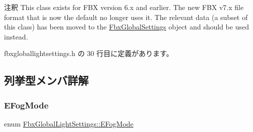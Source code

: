 \begin{DoxyRemark}{注釈}
This class exists for F\+BX version 6.\+x and earlier. The new F\+BX v7.\+x file format that is now the default no longer uses it. The relevant data (a subset of this class) has been moved to the \hyperlink{class_fbx_global_settings}{Fbx\+Global\+Settings} object and should be used instead. 
\end{DoxyRemark}


 fbxgloballightsettings.\+h の 30 行目に定義があります。



\subsection{列挙型メンバ詳解}
\mbox{\label{class_fbx_global_light_settings_a2d6040cb267cbdb092bdf9fb73de8d6d}} 
\subsubsection{\texorpdfstring{E\+Fog\+Mode}{EFogMode}}
{\footnotesize\ttfamily enum \hyperlink{class_fbx_global_light_settings_a2d6040cb267cbdb092bdf9fb73de8d6d}{Fbx\+Global\+Light\+Settings\+::\+E\+Fog\+Mode}}

